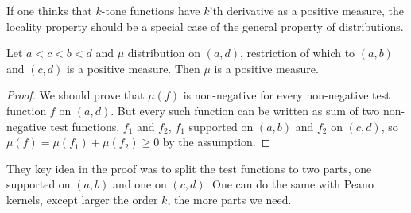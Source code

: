 If one thinks that $k$-tone functions have $k$'th derivative as a positive measure, the locality property should be a special case of the general property of distributions.
\begin{prop}
	Let $a < c < b < d$ and $\mu$ distribution on $(a, d)$, restriction of which to $(a, b)$ and $(c, d)$ is a positive measure. Then $\mu$ is a positive measure.
\end{prop}
\begin{proof}
	We should prove that $\mu(f)$ is non-negative for every non-negative test function $f$ on $(a, d)$. But every such function can be written as sum of two non-negative test functions, $f_{1}$ and $f_{2}$, $f_{1}$ supported on $(a, b)$ and $f_{2}$ on $(c, d)$, so $\mu(f) = \mu(f_{1}) + \mu(f_{2}) \geq 0$ by the assumption.
\end{proof}

They key idea in the proof was to split the test functions to two parts, one supported on $(a, b)$ and one on $(c, d)$. One can do the same with Peano kernels, except larger the order $k$, the more parts we need. 

